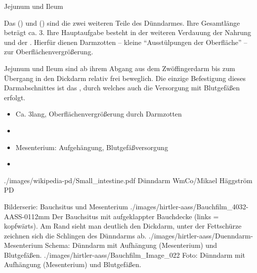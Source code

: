 \TextSlideTeaser
{Jejunum und Ileum}%
{%
Das  () 
und  () 
sind die zwei
weiteren Teile des Dünndarmes. Ihre Gesamtlänge beträgt ca.
3\Meter* . Ihre Hauptaufgabe besteht in der weiteren
Verdauung der Nahrung und der . Hierfür
dienen Darmzotten -- kleine \protect\enquote{Ausstülpungen
der Oberfläche} -- zur Oberflächenvergrößerung.

\label{topic:mesenterium}
Jejunum und Ileum sind ab ihrem Abgang aus dem Zwöffingerdarm bis
zum Übergang in den Dickdarm relativ frei beweglich. Die
einzige Befestigung dieses Darmabschnittes ist das
 , durch welches auch die Versorgung mit Blutgefäßen erfolgt.

}%
{
\begin{itemize}
    \item Ca. 3\Meter* lang, Oberflächenvergrößerung durch Darm\-zotten
    \item {}
    \item Mesenterium: Aufgehängung, Blutgefäßversorgung
    \item {}
\end{itemize}}%
{./images/wikipedia-pd/Small_intestine.pdf}%
{Dünndarm}%
{}%
{WmCo/Mikael Häggström}%
{PD}%

\begin{PictureSeriesWide}{}{Bilderserie: Bauchsitus und
Mesenterium}
{./images/hirtler-aass/Bauchfilm_4032-AASS-0112mm}
{Der Bauchsitus mit aufgeklappter
Bauchdecke (links = kopfwärts). Am Rand sieht man deutlich
den Dickdarm, unter der Fettschürze zeichnen sich die
Schlingen des Dünndarms ab. }
{./images/hirtler-aass/Duenndarm-Mesenterium}
{Schema: Dünndarm mit Aufhängung
(Mesenterium) und Blutgefäßen. }
{./images/hirtler-aass/Bauchfilm_Image_022}
{Foto: Dünndarm mit Aufhängung
(Mesenterium) und Blutgefäßen. }
{}
{}
\end{PictureSeriesWide}



